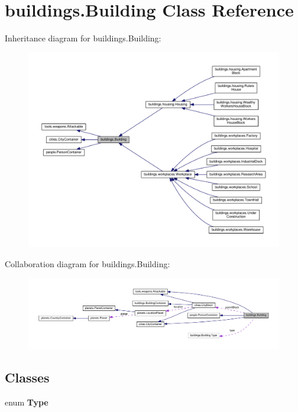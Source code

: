 \hypertarget{classbuildings_1_1_building}{}\section{buildings.\+Building Class Reference}
\label{classbuildings_1_1_building}


Inheritance diagram for buildings.\+Building\+:\nopagebreak
\begin{figure}[H]
\begin{center}
\leavevmode
\includegraphics[width=350pt]{classbuildings_1_1_building__inherit__graph}
\end{center}
\end{figure}


Collaboration diagram for buildings.\+Building\+:\nopagebreak
\begin{figure}[H]
\begin{center}
\leavevmode
\includegraphics[width=350pt]{classbuildings_1_1_building__coll__graph}
\end{center}
\end{figure}
\subsection*{Classes}
\begin{DoxyCompactItemize}
\item 
enum {\bfseries Type}
\end{DoxyCompactItemize}
